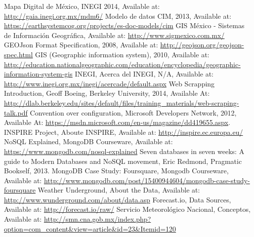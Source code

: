 \begin{thebibliography}{1}
		Mapa Digital de México, INEGI 2014, Available at: \url{http://gaia.inegi.org.mx/mdm6/}
	   Modelo de datos CIM, 2013, Available at: \url{https://earthsystemcog.org/projects/es-doc-models/cim}
		 GIS México - Sistemas de Información Geográfica, Available at: \url{http://www.sigmexico.com.mx/}
	     GEOJson Format Specification, 2008, Available at: \url{http://geojson.org/geojson-spec.html}
		 GIS (Geographic information system), 2010, Available at: \url{http://education.nationalgeographic.com/education/encyclopedia/geographic-information-system-gis}
		INEGI, Acerca del INEGI, N/A, Available at: \url{http://www.inegi.org.mx/inegi/acercade/default.aspx}
		Web Scrapping Introduction, Geoff Boeing, Berkeley University, 2014, Available At: \url{http://dlab.berkeley.edu/sites/default/files/training\_materials/web-scraping-talk.pdf}
		Convention over configuration, Microsoft Developers Network, 2012, Available At: \url{https://msdn.microsoft.com/en-us/magazine/dd419655.aspx}.
	    INSPIRE Project, Aboute INSPIRE, Available at: \url{http://inspire.ec.europa.eu/}
		NoSQL Explained, MongoDB Courseware, Available at: \url{https://www.mongodb.com/nosql-explained}
		Seven databases in seven weeks: A guide to Modern Databases and NoSQL movement, Eric Redmond, Pragmatic Bookself, 2013.
		MongoDB Case Study: Foursquare, Mongodb Courseware, Available at: \url{http://www.mongodb.com/post/15400944604/mongodb-case-study-foursquare}
		Weather Underground, About the Data, Available at: \url{http://www.wunderground.com/about/data.asp}
		Forecast.io, Data Sources, Available at: \url{http://forecast.io/raw/}
		Servicio Meteorológico Nacional, Conceptos, Available at: \url{http://smn.cna.gob.mx/index.php?option=com_content&view=article&id=23&Itemid=120}
\end{thebibliography}